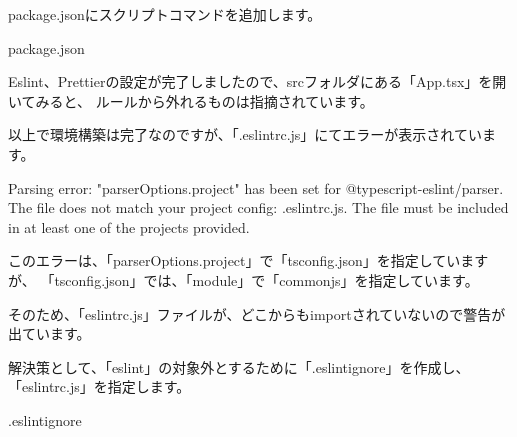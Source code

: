 package.jsonにスクリプトコマンドを追加します。

\def\startercodeblockfontsize{}
\begin{starterprogram}[]{package.json}\end{starterprogram}

Eslint、Prettierの設定が完了しましたので、srcフォルダにある「App.tsx」を開いてみると、
ルールから外れるものは指摘されています。

\vspace*{\baselineskip}

以上で環境構築は完了なのですが、「.eslintrc.js」にてエラーが表示されています。

\begin{starterquote}

Parsing error: "parserOptions.project" has been set for @typescript{-}eslint/parser.
The file does not match your project config: .eslintrc.js.
The file must be included in at least one of the projects provided.

\end{starterquote}

このエラーは、「parserOptions.project」で「tsconfig.json」を指定していますが、
「tsconfig.json」では、「module」で「commonjs」を指定しています。

\vspace*{\baselineskip}

そのため、「eslintrc.js」ファイルが、どこからもimportされていないので警告が出ています。

\vspace*{\baselineskip}

解決策として、「eslint」の対象外とするために「.eslintignore」を作成し、「eslintrc.js」を指定します。

\def\startercodeblockfontsize{}
\begin{starterprogram}[]{.eslintignore}\end{starterprogram}

